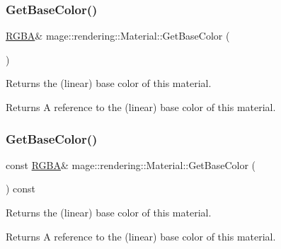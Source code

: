 \subsubsection{\texorpdfstring{Get\+Base\+Color()}{GetBaseColor()}\hspace{0.1cm}{\footnotesize\ttfamily [1/2]}}
{\footnotesize\ttfamily \hyperlink{structmage_1_1_r_g_b_a}{R\+G\+BA}\& mage\+::rendering\+::\+Material\+::\+Get\+Base\+Color (\begin{DoxyParamCaption}{ }\end{DoxyParamCaption})\hspace{0.3cm}{\ttfamily [noexcept]}}

Returns the (linear) base color of this material.

\begin{DoxyReturn}{Returns}
A reference to the (linear) base color of this material. 
\end{DoxyReturn}
\hypertarget{classmage_1_1rendering_1_1_material_aa98da3297c5043b9107638c877382bd8}{}\label{classmage_1_1rendering_1_1_material_aa98da3297c5043b9107638c877382bd8} 
\subsubsection{\texorpdfstring{Get\+Base\+Color()}{GetBaseColor()}\hspace{0.1cm}{\footnotesize\ttfamily [2/2]}}
{\footnotesize\ttfamily const \hyperlink{structmage_1_1_r_g_b_a}{R\+G\+BA}\& mage\+::rendering\+::\+Material\+::\+Get\+Base\+Color (\begin{DoxyParamCaption}{ }\end{DoxyParamCaption}) const\hspace{0.3cm}{\ttfamily [noexcept]}}

Returns the (linear) base color of this material.

\begin{DoxyReturn}{Returns}
A reference to the (linear) base color of this material. 
\end{DoxyReturn}
\hypertarget{classmage_1_1rendering_1_1_material_a363d85135b18e4e8c8a0b1d2fd88a435}{}\label{classmage_1_1rendering_1_1_material_a363d85135b18e4e8c8a0b1d2fd88a435} 
